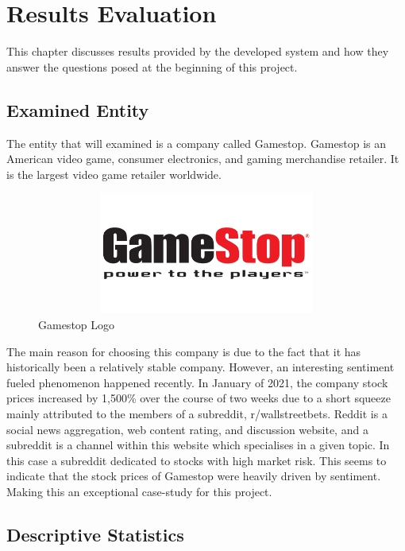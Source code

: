 
\chapter{Results Evaluation}

This chapter discusses results provided by the developed system and how they answer the questions posed at the beginning of this project.

\section{Examined Entity}

The entity that will examined is a company called Gamestop. Gamestop is an American video game, consumer electronics, and gaming merchandise retailer. It is the largest video game retailer worldwide.

\begin{figure}[h!]
    \centering
    \includegraphics[width=15cm,height=4cm,keepaspectratio]{resultsEvaluation/gamestop.png}
    \caption{Gamestop Logo}
    \label{fig:gamestop}
\end{figure}

The main reason for choosing this company is due to the fact that it has historically been a relatively stable company. However, an interesting sentiment fueled phenomenon happened recently. In January of 2021, the company stock prices increased by 1,500\% over the course of two weeks due to a short squeeze mainly attributed to the members of a subreddit, r/wallstreetbets. Reddit is a social news aggregation, web content rating, and discussion website, and a subreddit is a channel within this website which specialises in a given topic. In this case a subreddit dedicated to stocks with high market risk. This seems to indicate that the stock prices of Gamestop were heavily driven by sentiment. Making this an exceptional case-study for this project.

\section{Descriptive Statistics}

